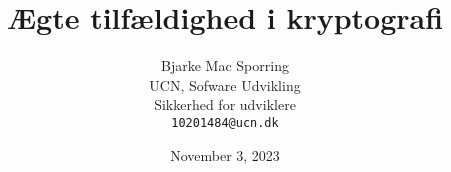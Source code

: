 \documentclass{article}
\title{Ægte tilfældighed i kryptografi}
\date{November 3, 2023}
\author{ \hspace{1mm}Bjarke Mac Sporring\\
  UCN, Sofware Udvikling\\
	Sikkerhed for udviklere\\
	\texttt{10201484@ucn.dk} \\
}
\begin{document}
\maketitle

\begin{abstract}
  
\end{abstract}


\end{document}

